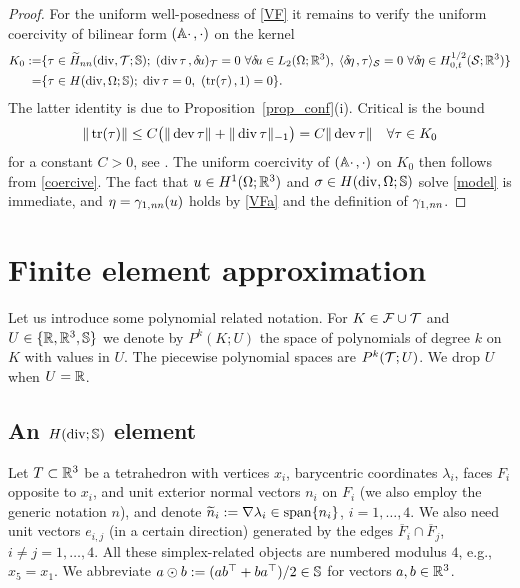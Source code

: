 \documentclass[11pt]{article}
\begin{document}
\begin{proof}
For the uniform well-posedness of \eqref{VF} it remains to verify the
uniform coercivity of bilinear form $(\mathbb{A}\cdot\hspace*{.5mm},\cdot)$ on the kernel
\begin{align*}
   K_0 :=
   &\{\tau\in \wtilde H_{nn}(\div,\mesh;\SS);\;
     \vdual{\div\tau}{\du}_\mesh=0\ \forall\du\in L_2(\Omega;\Rt),\;
     \dual{\deta}{\tau}_\cS=0\ \forall\deta\in H^{1/2}_{0,t}(\cS;\Rt)\}\\
   = &\{\tau\in H(\div,\Omega;\SS);\; \div\tau=0,\ \vdual{\tr(\tau)}{1}=0\}.
\end{align*}
The latter identity is due to Proposition~\ref{prop_conf}(i).
Critical is the bound
\[
   \|\operatorname{tr}(\tau)\| \le
   C \bigl( \|\operatorname{dev}\tau\| + \|\operatorname{div}\tau\|_{-1}\bigr)
   = C \|\operatorname{dev}\tau\|\quad\forall \tau\in K_0
\]
for a constant $C>0$, see \cite[Theorem~1]{CarstensenH_FOT}.
The uniform coercivity of $(\mathbb{A}\cdot\hspace*{.5mm},\cdot)$ on $K_0$
then follows from \eqref{coercive}.
The fact that $u\in H^1(\Omega;\mathbb{R}^3)$ and $\sigma\in H(\operatorname{div},\Omega;\mathbb{S})$ solve
\eqref{model} is immediate, and
$\eta={\gamma_{1,\mathit{nn}}}(u)$ holds by \eqref{VFa} and the definition of ${\gamma_{1,\mathit{nn}}}$.
\end{proof}
\section{Finite element approximation} \label{sec_fem}

Let us introduce some polynomial related notation.
For $K\in\mathcal{F}\cup\mathcal{T}$ and $U\in\{\mathbb{R},\mathbb{R}^3,\mathbb{S}\}$ we denote by $P^k(K;U)$
the space of polynomials of degree $k$ on $K$ with values in $U$.
The piecewise polynomial spaces are $P^k(\mathcal{T};U)$. We drop $U$ when $U=\mathbb{R}$.


\subsection{An $H(\operatorname{div};\mathbb{S})$ element} \label{sec_el}

Let $T\subset\mathbb{R}^3$ be a tetrahedron with vertices $x_i$, barycentric coordinates $\lambda_i$,
faces $F_i$ opposite to $x_i$, and unit exterior normal vectors $n_i$ on $F_i$
(we also employ the generic notation $n$),
and denote $\widetilde n_i:=\nabla\lambda_i\in\mathrm{span}\{n_i\}$, $i=1,\ldots,4$.
We also need unit vectors $e_{i,j}$ (in a certain direction) generated by the edges
$\overline{F}_i\cap\overline{F}_j$, $i\not=j=1,\ldots,4$.
All these simplex-related objects are numbered modulus $4$, e.g., $x_5=x_1$.
We abbreviate $a\odot b:= (a b^\top+b a^\top)/2\in\mathbb{S}$ for vectors $a,b\in\mathbb{R}^3$.
\end{document}
